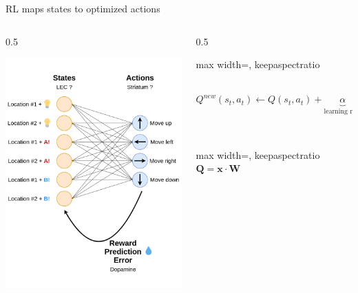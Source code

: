\documentclass[bigger]{beamer}
\begin{document}
\begin{frame}[label={sec:orgd153469}]{RL maps states to optimized actions}
\begin{columns}
\begin{column}{0.5\columnwidth}
\begin{center}
\includegraphics[height=0.8\textheight]{./img/RL_mapping.drawio.png}
\end{center}
\end{column}
\begin{column}{0.5\columnwidth}
\begin{adjustbox}{max width=\columnwidth, keepaspectratio}
\( Q^{new}(s_t, a_t) \longleftarrow Q(s_t, a_t) + \underbrace{\alpha}_\text{learning rate}\overbrace{(\underbrace{r_t}_\text{reward} + \gamma \operatorname*{max}_a Q(s_{t+1, a}) - Q(s_t, a_t))}^\text{temporal difference} \)
\end{adjustbox}\\[1em]
\begin{adjustbox}{max width=\columnwidth, keepaspectratio}
\( \mathbf{Q} = \mathrm{\mathbf{x}} \cdot \mathbf{W} \)
\end{adjustbox}
\end{column}
\end{columns}
\end{frame}
\end{document}
